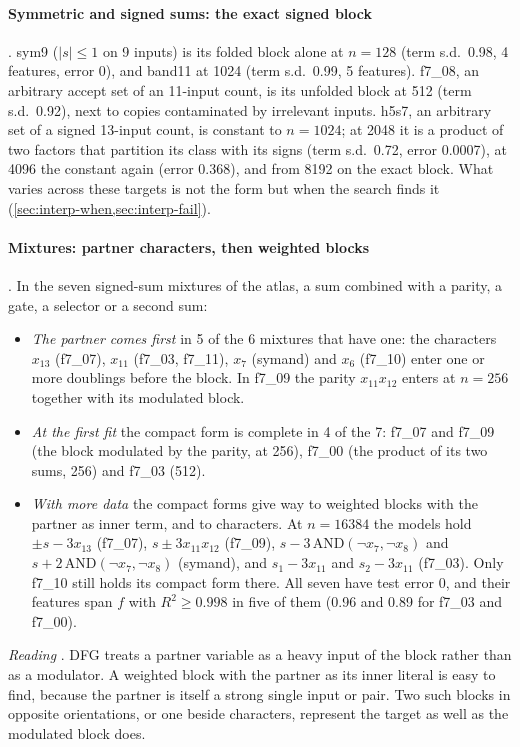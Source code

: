 \paragraph{Symmetric and signed sums: the exact signed block} . sym9 ($|s|\le1$ on 9 inputs) is its folded block alone at $n=128$ (term s.d.\ 0.98, 4 features, error 0), and band11 at 1024 (term s.d.\ 0.99, 5 features). f7\_08, an arbitrary accept set of an 11-input count, is its unfolded block at 512 (term s.d.\ 0.92), next to copies contaminated by irrelevant inputs. h5s7, an arbitrary set of a signed 13-input count, is constant to $n=1024$; at 2048 it is a product of two factors that partition its class with its signs (term s.d.\ 0.72, error 0.0007), at 4096 the constant again (error 0.368), and from 8192 on the exact block. What varies across these targets is not the form but when the search finds it (\cref{sec:interp-when,sec:interp-fail}).

\paragraph{Mixtures: partner characters, then weighted blocks} . In the seven signed-sum mixtures of the atlas, a sum combined with a parity, a gate, a selector or a second sum:
\begin{itemize}
\item \emph{The partner comes first} in 5 of the 6 mixtures that have one: the characters $x_{13}$ (f7\_07), $x_{11}$ (f7\_03, f7\_11), $x_7$ (symand) and $x_6$ (f7\_10) enter one or more doublings before the block. In f7\_09 the parity $x_{11}x_{12}$ enters at $n=256$ together with its modulated block.
\item \emph{At the first fit} the compact form is complete in 4 of the 7: f7\_07 and f7\_09 (the block modulated by the parity, at 256), f7\_00 (the product of its two sums, 256) and f7\_03 (512).
\item \emph{With more data} the compact forms give way to weighted blocks with the partner as inner term, and to characters. At $n=16384$ the models hold $\pm s-3x_{13}$ (f7\_07), $s\pm3x_{11}x_{12}$ (f7\_09), $s-3\,\mathrm{AND}(\neg x_7,\neg x_8)$ and $s+2\,\mathrm{AND}(\neg x_7,\neg x_8)$ (symand), and $s_1-3x_{11}$ and $s_2-3x_{11}$ (f7\_03). Only f7\_10 still holds its compact form there. All seven have test error 0, and their features span $f$ with $R^2\ge0.998$ in five of them (0.96 and 0.89 for f7\_03 and f7\_00).
\end{itemize}
\emph{Reading} . DFG treats a partner variable as a heavy input of the block rather than as a modulator. A weighted block with the partner as its inner literal is easy to find, because the partner is itself a strong single input or pair. Two such blocks in opposite orientations, or one beside characters, represent the target as well as the modulated block does.

